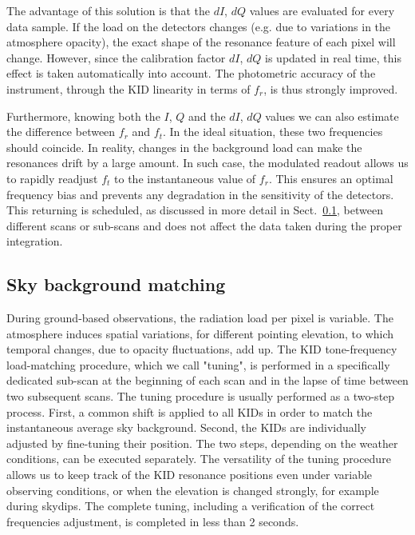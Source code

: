 \documentclass[]{aa} %
\begin{document}
The advantage of this solution is that the $dI$, $dQ$ values are evaluated for every data sample. If the load on the detectors changes (e.g. due to variations in the atmosphere opacity), the exact shape of the resonance feature of each pixel will change. However, since the calibration factor $dI$, $dQ$ is updated in real time, this effect is taken automatically into account. The photometric accuracy of the instrument, through the KID linearity in terms of $f_r$, is thus strongly improved.

Furthermore, knowing both the $I$, $Q$ and the $dI$, $dQ$ values we can also estimate the difference between $f_r$ and $f_t$. In the ideal situation, these two frequencies should coincide. In reality, changes in the background load can make the resonances drift by a large amount. In such case, the modulated readout allows us to rapidly readjust $f_t$ to the instantaneous value of $f_r$. This ensures an optimal frequency bias and prevents any degradation in the sensitivity of the detectors. This returning is scheduled, as discussed in more detail in Sect.~\ref{Sky background matching}, between different scans or sub-scans and does not affect the data taken during the proper integration.

\subsection{Sky background matching}
\label{Sky background matching}

During ground-based observations, the radiation load per pixel is variable. The atmosphere induces spatial variations, for different pointing elevation, to which temporal changes, due to opacity fluctuations, add up. The KID tone-frequency load-matching procedure, which we call "tuning", is performed in a specifically dedicated sub-scan at the beginning of each scan and in the lapse of time between two subsequent scans. The tuning procedure is usually performed as a two-step process. First, a common shift is applied to all KIDs in order to match the instantaneous average sky background. Second, the KIDs are individually adjusted by fine-tuning their position. The two steps, depending on the weather conditions, can be executed separately. The versatility of the tuning procedure allows us to keep track of the KID resonance positions even under variable observing conditions, or when the elevation is changed strongly, for example during skydips. The complete tuning, including a verification of the correct frequencies adjustment, is completed in less than 2 seconds. 
\end{document}
